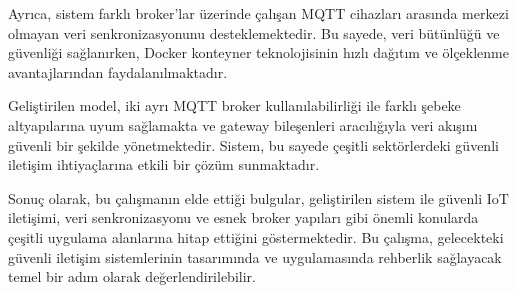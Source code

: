 \documentclass[conference, a4paper]{IEEEtran}
\begin{document}
    Ayrıca, sistem farklı broker'lar üzerinde çalışan MQTT cihazları arasında merkezi olmayan veri senkronizasyonunu desteklemektedir. Bu sayede, veri bütünlüğü ve güvenliği sağlanırken, Docker konteyner teknolojisinin hızlı dağıtım ve ölçeklenme avantajlarından faydalanılmaktadır.

    Geliştirilen model, iki ayrı MQTT broker kullanılabilirliği ile farklı şebeke altyapılarına uyum sağlamakta ve gateway bileşenleri aracılığıyla veri akışını güvenli bir şekilde yönetmektedir. Sistem, bu sayede çeşitli sektörlerdeki güvenli iletişim ihtiyaçlarına etkili bir çözüm sunmaktadır.

    Sonuç olarak, bu çalışmanın elde ettiği bulgular, geliştirilen sistem ile güvenli IoT iletişimi, veri senkronizasyonu ve esnek broker yapıları gibi önemli konularda çeşitli uygulama alanlarına hitap ettiğini göstermektedir. Bu çalışma, gelecekteki güvenli iletişim sistemlerinin tasarımında ve uygulamasında rehberlik sağlayacak temel bir adım olarak değerlendirilebilir.
\end{document}

